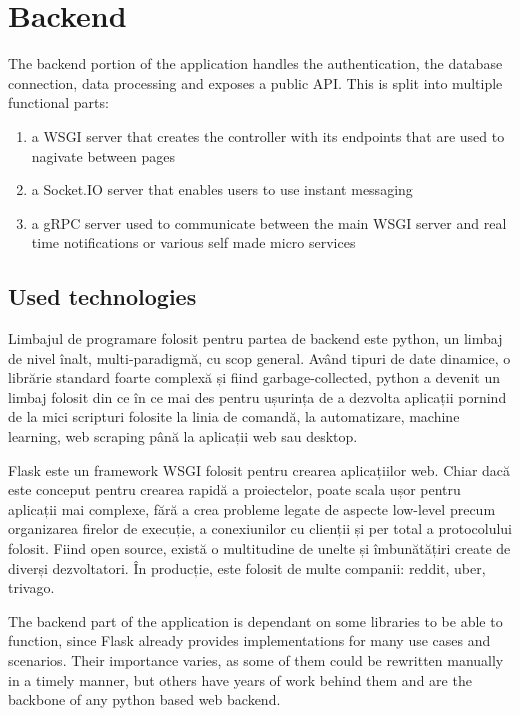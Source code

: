     \section{Backend}
    The backend portion of the application handles the authentication, the database connection, data processing and exposes a public API. This is split into multiple functional parts:
    \begin{enumerate}[noitemsep, label=\textbullet, leftmargin=0.3cm]
        \item a WSGI server that creates the controller with its endpoints that are used to nagivate between pages
        \item a Socket.IO server that enables users to use instant messaging
        \item a gRPC server used to communicate between the main WSGI server and real time notifications or various self made micro services
    \end{enumerate}

    
    \subsection{Used technologies}
    Limbajul de programare folosit pentru partea de backend este python, un limbaj de nivel înalt, multi-paradigmă, cu scop general. Având tipuri de date dinamice, o librărie standard foarte complexă și fiind garbage-collected, python a devenit un limbaj folosit din ce în ce mai des pentru ușurința de a dezvolta aplicații pornind de la mici scripturi folosite la linia de comandă, la automatizare, machine learning, web scraping până la aplicații web sau desktop. 

    Flask este un framework WSGI folosit pentru crearea aplicațiilor web. Chiar dacă este conceput pentru crearea rapidă a proiectelor, poate scala ușor pentru aplicații mai complexe, fără a crea probleme legate de aspecte low-level precum organizarea firelor de execuție, a conexiunilor cu clienții și per total a protocolului folosit. Fiind open source, există o multitudine de unelte și îmbunătățiri create de diverși dezvoltatori. În producție, este folosit de multe companii: reddit, uber, trivago.

    The backend part of the application is dependant on some libraries to be able to function, since Flask already provides implementations for many use cases and scenarios. Their importance varies, as some of them could be rewritten manually in a timely manner, but others have years of work behind them and are the backbone of any python based web backend.
    
